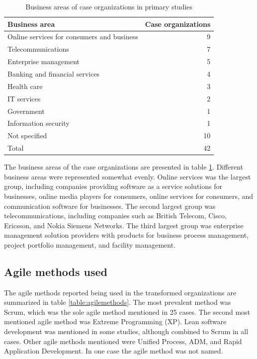 \documentclass[preprint,authoryear,12pt]{elsarticle}
\begin{document}
\begin{table}[!t]
    \centering
    \begin{tabular}{ l r }
        \toprule
        Business area    &  Case organizations   \\
        \midrule
		Online services for consumers and business  &  9  \\
		Telecommunications                          &  7  \\
		Enterprise management                       &  5  \\
		Banking and financial services              &  4  \\
		Health care                                  &  3  \\
		IT services                                 &  2  \\
		Government                                  &  1  \\
		Information security                        &  1  \\
		Not specified                               & 10  \\
        \midrule
		Total                                       & 42  \\
        \bottomrule
    \end{tabular}
    \caption{Business areas of case organizations in primary studies}
    \label{table:businessareas}
\end{table}

The business areas of the case organizations are presented in table
\ref{table:businessareas}. Different business areas were represented somewhat
evenly. Online services was the largest group, including companies
providing software as a service solutions for businesses, online media players
for consumers, online services for consumers, and communication software for
businesses. The second largest group was telecommunications, including companies
such as British Telecom, Cisco, Ericsson, and Nokia Siemens Networks. The third
largest group was enterprise management solution providers with products for
business process management, project portfolio management, and facility
management.


\subsection{Agile methods used}

The agile methods reported being used in the transformed organizations are
summarized in table \ref{table:agilemethods}. The most prevalent method was
Scrum, which was the sole agile method mentioned in 25 cases. The second most
mentioned agile method was Extreme Programming (XP). Lean software development
was mentioned in some studies, although combined to Scrum in all cases. Other
agile methods mentioned were Unified Process, ADM, and Rapid Application
Development. In one case the agile method was not named.
\end{document}
